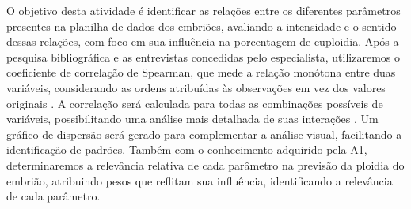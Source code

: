 O objetivo desta atividade é identificar as relações entre os diferentes parâmetros presentes na planilha de dados dos embriões, avaliando a intensidade e o sentido dessas relações, com foco em sua influência na porcentagem de euploidia. Após a pesquisa bibliográfica e as entrevistas concedidas pelo especialista, utilizaremos o coeficiente de correlação de Spearman, que mede a relação monótona entre duas variáveis, considerando as ordens atribuídas às observações em vez dos valores originais \cite{sousa2019}. A correlação será calculada para todas as combinações possíveis de variáveis, possibilitando uma análise mais detalhada de suas interações \cite{sousa2019}. Um gráfico de dispersão será gerado para complementar a análise visual, facilitando a identificação de padrões. Também com o conhecimento adquirido pela A1, determinaremos a relevância relativa de cada parâmetro na previsão da ploidia do embrião, atribuindo pesos que reflitam sua influência, identificando a relevância de cada parâmetro.

